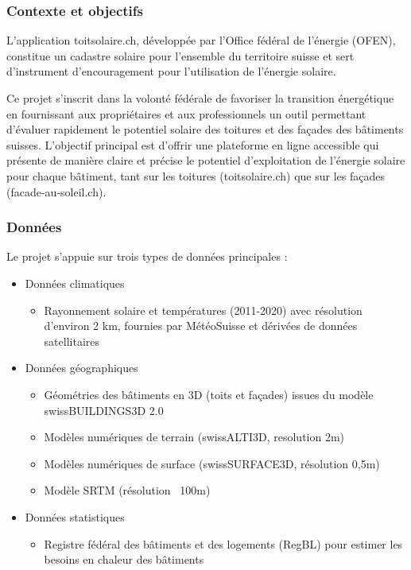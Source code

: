 \subsubsection{Contexte et objectifs}
L'application toitsolaire.ch, développée par l'Office fédéral de l'énergie (OFEN), constitue un cadastre solaire pour l'ensemble du territoire suisse et sert d'instrument d'encouragement pour l'utilisation de l'énergie solaire.

Ce projet s'inscrit dans la volonté fédérale de favoriser la transition énergétique en fournissant aux propriétaires et aux professionnels un outil permettant d'évaluer rapidement le potentiel solaire des toitures et des façades des bâtiments suisses. L'objectif principal est d'offrir une plateforme en ligne accessible qui présente de manière claire et précise le potentiel d'exploitation de l'énergie solaire pour chaque bâtiment, tant sur les toitures (toitsolaire.ch) que sur les façades (facade-au-soleil.ch).

\subsubsection{Données}
\par{Le projet s'appuie sur trois types de données principales :}
\begin{itemize}
    \item Données climatiques
    \begin{itemize}
        \item Rayonnement solaire et températures (2011-2020) avec résolution d'environ 2 km, fournies par MétéoSuisse et dérivées de données satellitaires
    \end{itemize}
    \item Données géographiques
    \begin{itemize}
        \item Géométries des bâtiments en 3D (toits et façades) issues du modèle swissBUILDINGS3D 2.0
        \item Modèles numériques de terrain (swissALTI3D, resolution 2m)
        \item Modèles numériques de surface (swissSURFACE3D, résolution 0,5m)
        \item Modèle SRTM (résolution ~100m)
    \end{itemize}
    \item Données statistiques
        \begin{itemize}
        \item Registre fédéral des bâtiments et des logements (RegBL) pour estimer les besoins en chaleur des bâtiments
        \end{itemize}
    \end{itemize}

